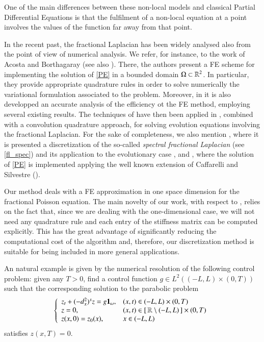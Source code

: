 One of the main differences between these non-local models and classical Partial Differential Equations is that the fulfilment of a non-local equation at a point involves the values of the function far away from that point.

In the recent past, the fractional Laplacian has been widely analysed also from the point of view of numerical analysis. We refer, for instance, to the work \cite{acosta2017fractional} of Acosta and Borthagaray (see also \cite{acosta2017short}). There, the authors present a FE scheme for implementing the solution of \eqref{PE} in a bounded domain $\Omega\subset\mathbb{R}^2$. In particular, they provide appropriate quadrature rules in order to solve numerically the variational formulation associated to the problem. Moreover, in \cite{acosta2017fractional} it is also developped an accurate analysis of the efficiency ot the FE method, employing several existing results. The techniques of \cite{acosta2017fractional,acosta2017short} have then been applied in \cite{acosta2017finite}, combined with a convolution quadrature approach, for solving evolution equations involving the fractional Laplacian. For the sake of completeness, we also mention \cite{bonito2015numerical}, where it is presented a discretization of the so-called \textit{spectral fractional Laplacian} (see \eqref{fl_spec}) and its application to the evolutionary case \cite{bonito2017approximation}, and \cite{nochetto2015pde}, where the solution of \eqref{PE} is implemented applying the well known extension of Caffarelli and Silvestre (\cite{caffarelli2007extension}).   

Our method deals with a FE approximation in one space dimension for the fractional Poisson equation. The main novelty of our work, with respect to \cite{acosta2017short,acosta2017fractional}, relies on the fact that, since we are dealing with the one-dimensional case, we will not need any quadrature rule and each entry of the stiffness matrix can be computed explicitly. This has the great advantage of significantly reducing the computational cost of the algorithm and, therefore, our discretization method is suitable for being included in more general applications.  

An natural example is given by the numerical resolution of the following control problem: given any $T>0$, find a control function $g\in L^2((-L,L)\times(0,T))$ such that the corresponding solution to the parabolic problem 
\begin{align}\label{heat_frac}
	\left\{\begin{array}{ll}
	z_t + (-d_x^2)^{s}z = g\mathbf{1}_{\omega}, & (x,t)\in (-L,L)\times(0,T)
	\\
	z=0, & (x,t)\in[\,\mathbb{R}\setminus (-L,L)\,]\times(0,T)
	\\
	z(x,0)=z_0(x), & x\in (-L,L)
	\end{array}\right.
\end{align} 
satisfies $z(x,T)=0$. 

